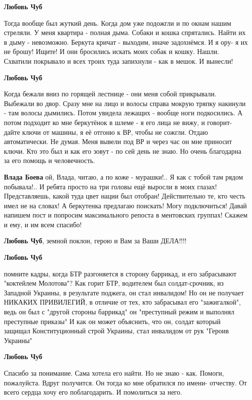 \begin{itemize}
\begin{itemize}
\textbf{Любовь Чуб} 

Тогда вообще был жуткий день. Когда дом уже подожгли и по окнам нашим стреляли.
У меня квартира - полная дыма. Собаки и кошка спрятались. Найти их в дыму -
невозможно. Беркута кричат - выходим, иначе задохнёмся. И я ору- я их не брошу!
Ищите! И они бросились искать моих собак и кошку. Нашли. Схватили покрывало и
всех троих туда запихнули - как в мешок. И вынесли!

\textbf{Любовь Чуб} 

Когда бежали вниз по горящей лестнице - они меня собой прикрывали. Выбежали во
двор. Сразу мне на лицо и волосы справа мокрую тряпку накинули - там волосы
дымились. Потом увидела лежащих - вообще ноги подкосились. А потом подходит ко
мне беркутёнок в шлеме - я его лица не вижу, и говорит- дайте ключи от машины,
я её отгоню к ВР, чтобы не сожгли. Отдаю автоматически. Не думая. Меня вывели
под ВР и через час он мне приносит ключи. Кто это был и как его зовут - по сей
день не знаю. Но очень благодарна за его помощь и человечность.

\textbf{Влада Боева} ой, Влада, читаю, а по коже - мурашки!..
Я как с тобой там рядом побывала!..
И ребята просто на три головы ещё выросли в моих глазах!
Представляешь, какой туда цвет нации был отобран!
Действительно те, кто честь имел не на словах!
А беркутенка предлагаю поискать! Могу подключиться!
Давай напишем пост и попросим максимального репоста в ментовских группах!
Скажем и ему, и им всем спасибо!

\textbf{Любовь Чуб}, земной поклон, герою и Вам за Ваши ДЕЛА!!!!

\textbf{Любовь Чуб} 

помните кадры, когда БТР разгоняется в сторону баррикад, и его забрасывают
"коктейлем Молотова"? Как горит БТР, водителем был солдат-срочник, из Западной
Украины, в результате поджега, он стал инвалидом! Но он не получает НИКАКИХ
ПРИВИЛЕГИЙ, в отличие от тех, кто забрасывал его "зажигалкой", ведь он был с
"другой стороны баррикад" он "преступный режим и выполнял преступные приказы" И
как он может объяснить, что он, солдат который защищал Конституционный строй
Украины, стал инвалидом от рук "Героив Украины"

\textbf{Любовь Чуб} 

Спасибо за понимание. Сама хотела его найти. Но не знаю - как. Помоги,
пожалуйста. Вдруг получится. Он тогда ко мне обратился по имени- отчеству. От
всего сердца хочу его поблагодарить. И помолиться за него.


\end{itemize}
\end{itemize}
